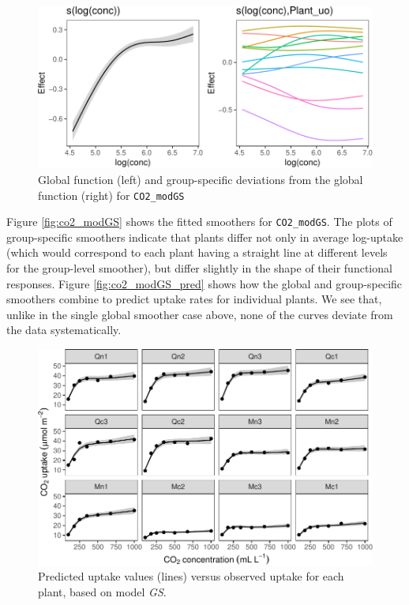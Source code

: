 \documentclass[12pt]{article}
\begin{document}
\begin{figure}
\includegraphics[width=\linewidth]{../figures/co2_modGS_plot-1} \caption{\label{fig:co2_modGS}Global function (left) and group-specific deviations from the global function (right) for \texttt{CO2\_modGS}}\label{fig:co2_modGS_plot}
\end{figure}

Figure \ref{fig:co2_modGS} shows the fitted smoothers for
\texttt{CO2\_modGS}. The plots of group-specific smoothers indicate that
plants differ not only in average log-uptake (which would correspond to
each plant having a straight line at different levels for the
group-level smoother), but differ slightly in the shape of their
functional responses. Figure \ref{fig:co2_modGS_pred} shows how the
global and group-specific smoothers combine to predict uptake rates for
individual plants. We see that, unlike in the single global smoother
case above, none of the curves deviate from the data systematically.

\begin{figure}
\includegraphics[width=\linewidth]{../figures/co2_modGS_ggplot-1} \caption{\label{fig:co2_modGS_pred}Predicted uptake values (lines) versus observed uptake for each plant, based on model \emph{GS}.}\label{fig:co2_modGS_ggplot}
\end{figure}
\end{document}
